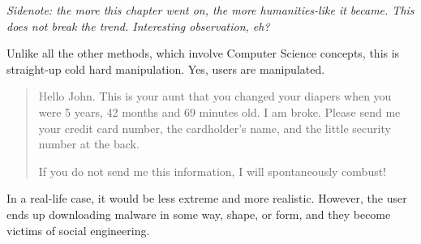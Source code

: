 \documentclass[../main.tex]{subfiles}
\begin{document}
\emph{Sidenote: the more this chapter went on, the more humanities-like it became. This does not break the trend. Interesting observation, eh?}

Unlike all the other methods, which involve Computer Science concepts, this is straight-up cold hard manipulation. Yes, users are manipulated.

\blockquote{\textcolor{gray}
Hello John. This is your aunt that you changed your diapers when you were 5 years, 42 months and 69 minutes old. I am broke. Please send me your credit card number, the cardholder's name, and the little security number at the back.

If you do not send me this information, I will spontaneously combust!
}

In a real-life case, it would be less extreme and more realistic. However, the user ends up downloading malware in some way, shape, or form, and they become victims of social engineering.
\end{document}
